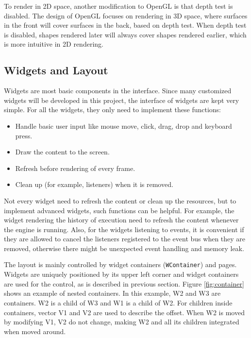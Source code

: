 \documentclass[msc,deptreport, cs]{infthesis}
\begin{document}
To render in 2D space, another modification to OpenGL is that depth test is disabled. The design of OpenGL focuses on rendering in 3D space, where surfaces in the front will cover surfaces in the back, based on depth test. When depth test is disabled, shapes rendered later will always cover shapes rendered earlier, which is more intuitive in 2D rendering.

\subsection{Widgets and Layout}

Widgets are most basic components in the interface. Since many customized widgets will be developed in this project, the interface of widgets are kept very simple. For all the widgets, they only need to implement these functions: 
\begin{itemize}
  \item Handle basic user input like mouse move, click, drag, drop and keyboard press.
  \vspace{-1em}\item Draw the content to the screen.
  \vspace{-1em}\item Refresh before rendering of every frame.
  \vspace{-1em}\item Clean up (for example, listeners) when it is removed.
\end{itemize}

Not every widget need to refresh the content or clean up the resources, but to implement advanced widgets, such functions can be helpful. For example, the widget rendering the history of execution need to refresh the content whenever the engine is running. Also, for the widgets listening to events, it is convenient if they are allowed to cancel the listeners registered to the event bus when they are removed, otherwise there might be unexpected event handling and memory leak.

The layout is mainly controlled by widget containers (\verb+WContainer+) and pages. Widgets are uniquely positioned by its upper left corner and widget containers are used for the control, as is described in previous section. Figure \ref{fig:container} shows an example of nested containers. In this example, W2 and W3 are containers. W2 is a child of W3 and W1 is a child of W2.
For children inside containers, vector V1 and V2 are used to describe the offset. When W2 is moved by modifying V1, V2 do not change, making W2 and all its children integrated when moved around.
\end{document}
